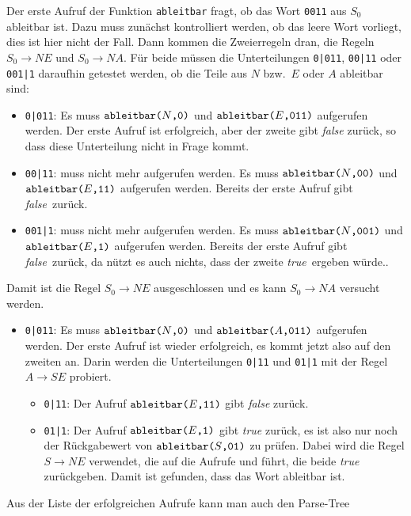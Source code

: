 \begin{loesung}
Der erste Aufruf der Funktion \texttt{ableitbar} fragt, ob das Wort
\texttt{0011} aus $S_0$ ableitbar ist.
Dazu muss zunächst kontrolliert werden, ob das leere Wort vorliegt,
dies ist hier nicht der Fall.
Dann kommen die Zweierregeln dran, die Regeln
$S_0\to NE$
und
$S_0\to NA$.
Für beide müssen die Unterteilungen
\texttt{0|011},
\texttt{00|11} oder
\texttt{001|1}
daraufhin getestet werden, ob die Teile aus $N$ bzw.~$E$ oder $A$
ableitbar sind:
\begin{itemize}
\item
\texttt{0|011}:
Es muss $\texttt{ableitbar(}N\texttt{,}\texttt{0}\texttt{)}$ und $\texttt{ableitbar(}E\texttt{,}\texttt{011}\texttt{)}$ 
aufgerufen werden.
Der erste Aufruf ist erfolgreich, aber der zweite gibt {\em false} zurück,
so dass diese Unterteilung nicht in Frage kommt.
\item
\texttt{00|11}: muss nicht mehr aufgerufen werden.
Es muss $\texttt{ableitbar(}N\texttt{,}\texttt{00}\texttt{)}$ und $\texttt{ableitbar(}E\texttt{,}\texttt{11}\texttt{)}$
aufgerufen werden.
Bereits der erste Aufruf gibt {\em false} zurück.
\item
\texttt{001|1}: muss nicht mehr aufgerufen werden.
Es muss $\texttt{ableitbar(}N\texttt{,}\texttt{001}\texttt{)}$ und $\texttt{ableitbar(}E\texttt{,}\texttt{1}\texttt{)}$
aufgerufen werden.
Bereits der erste Aufruf gibt {\em false} zurück, da nützt es auch
nichts, dass der zweite {\em true} ergeben würde..
\end{itemize}
Damit ist die Regel $S_0\to NE$ ausgeschlossen und es kann $S_0\to NA$
versucht werden.
\begin{itemize}
\item
\texttt{0|011}:
Es muss $\texttt{ableitbar(}N\texttt{,}\texttt{0}\texttt{)}$ und $\texttt{ableitbar(}A\texttt{,}\texttt{011}\texttt{)}$ 
aufgerufen werden.
Der erste Aufruf ist wieder erfolgreich, es kommt jetzt also auf den
zweiten an.
Darin werden die Unterteilungen \texttt{0|11} und \texttt{01|1}
mit der Regel $A\to SE$ probiert.
\begin{itemize}
\item
\texttt{0|11}: Der Aufruf $\texttt{ableitbar(}E\texttt{,}\texttt{11}\texttt{)}$ gibt {\em false}
zurück.
\item
\texttt{01|1}: Der Aufruf $\texttt{ableitbar(}E\texttt{,}\texttt{1}\texttt{)}$ gibt {\em true}
zurück, es ist also nur noch der Rückgabewert von $\texttt{ableitbar(}S\texttt{,}\texttt{01}\texttt{)}$
zu prüfen.
Dabei wird die Regel $S\to NE$ verwendet, die auf die Aufrufe
und
führt, die beide {\em true} zurückgeben.
Damit ist gefunden, dass das Wort ableitbar ist.
\end{itemize}
\end{itemize}
Aus der Liste der erfolgreichen Aufrufe kann man auch den Parse-Tree

\end{loesung}
